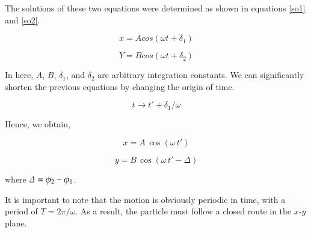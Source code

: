 The solutions of these two equations were determined as shown in equations \eqref{so1} and \eqref{so2}.

\begin{equation}
    \label{so1}
    x = A cos(\omega t + \delta_1)
\end{equation}

\begin{equation}
    \label{so2}
    Y = B cos(\omega t + \delta_2)
\end{equation}

In here, $A$, $B$, $\delta_1$, and $\delta_2$ are arbitrary integration constants. We can significantly shorten the previous equations by changing the origin of time. 

\begin{equation}
t\rightarrow t' + \delta_1/\omega
\end{equation}

Hence, we obtain,

\begin{equation}
\label{f1}
    x = A\,\cos(\omega\,t')
\end{equation}

\begin{equation}
\label{f2}
    y = B\,\cos(\omega\,t'-\Delta)
\end{equation}

where ${\mit\Delta}=\phi_2-\phi_1$. 

It is important to note that the motion is obviously periodic in time, with a period of $T=2\pi/ \omega$. As a result, the particle must follow a closed route in the $x$-$y$ plane.













